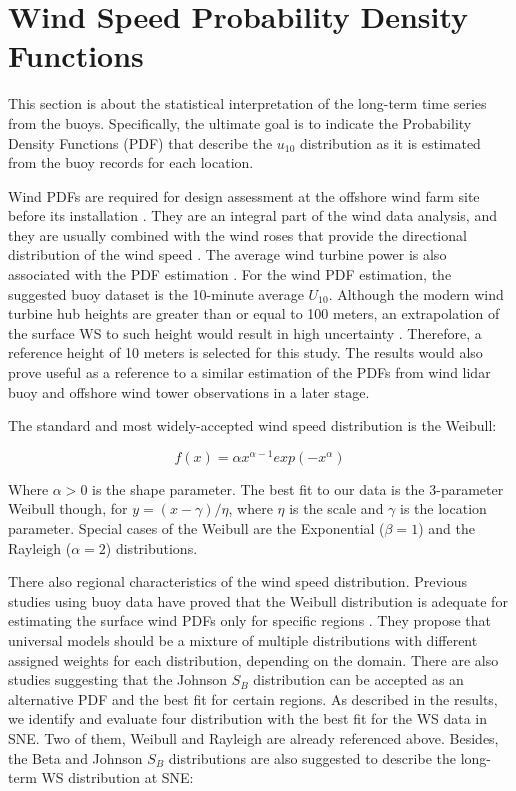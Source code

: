 

\section{Wind Speed Probability Density Functions}\label{wind_wave_pdfs}


This section is about the statistical interpretation of the long-term time series from the buoys. Specifically, the ultimate goal is to indicate the Probability Density Functions (PDF) that describe the $u_{10}$ distribution as it is estimated from the buoy records for each location.

Wind PDFs are required for design assessment at the offshore wind farm site before its installation \cite{Commision2019}. They are an integral part of the wind data analysis, and they are usually combined with the wind roses that provide the directional distribution of the wind speed \cite{DNVGL2018}. The average wind turbine
power is also associated with the PDF estimation \cite{Morgan2011}. For the wind PDF estimation, the suggested buoy dataset is the 10-minute average $U_{10}$. Although the modern wind turbine hub heights are greater than or equal to 100 meters, an extrapolation of the surface WS to such height would result in high uncertainty \cite{Ng2016}. Therefore, a reference height of 10 meters is selected for this study. The results would also prove useful as a reference to a similar estimation of the PDFs from wind lidar buoy and offshore wind tower observations in a later stage.

The standard and most widely-accepted wind speed distribution is the Weibull:


\begin{equation}
f(x) = \alpha x^{\alpha-1} exp\left( - x^\alpha \right)
\label{eqn:weibull_2p}
\end{equation}

Where $\alpha>0$ is the shape parameter. The best fit to our data is the 3-parameter Weibull though, for $y = (x-\gamma)/\eta$, where $\eta$ is the scale and $\gamma$ is the location parameter. Special cases of the Weibull are the Exponential ($\beta = 1$) and the Rayleigh ($\alpha = 2$) distributions.

There also regional characteristics of the wind speed distribution. Previous studies using buoy data have proved that the Weibull distribution is adequate for estimating the surface wind PDFs only for specific regions \citep{Morgan2011}. They propose that universal models should be a mixture of multiple distributions with different assigned weights for each distribution, depending on the domain. There are also studies suggesting that the Johnson $S_{B}$ \cite{Soukissian2013, Soukissian2014} distribution can be accepted as an alternative PDF and the best fit for certain regions. As described in the results, we identify and evaluate four distribution with the best fit for the WS data in SNE. Two of them, Weibull and Rayleigh are already referenced above. Besides, the Beta and Johnson $S_{B}$ distributions are also suggested to describe the long-term WS distribution at SNE:


